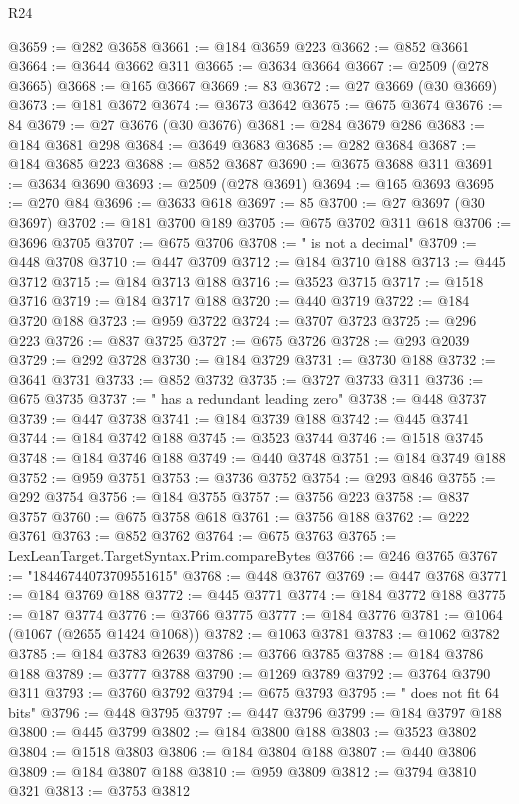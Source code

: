 \begin{lexlean}{R24}
\begin{coremodule}
@3659 := @282 @3658
@3661 := @184 @3659 @223
@3662 := @852 @3661
@3664 := @3644 @3662 @311
@3665 := @3634 @3664
@3667 := @2509 (@278 @3665)
@3668 := @165 @3667
@3669 := 83
@3672 := @27 @3669 (@30 @3669)
@3673 := @181 @3672
@3674 := @3673 @3642
@3675 := @675 @3674
@3676 := 84
@3679 := @27 @3676 (@30 @3676)
@3681 := @284 @3679 @286
@3683 := @184 @3681 @298
@3684 := @3649 @3683
@3685 := @282 @3684
@3687 := @184 @3685 @223
@3688 := @852 @3687
@3690 := @3675 @3688 @311
@3691 := @3634 @3690
@3693 := @2509 (@278 @3691)
@3694 := @165 @3693
@3695 := @270 @84
@3696 := @3633 @618
@3697 := 85
@3700 := @27 @3697 (@30 @3697)
@3702 := @181 @3700 @189
@3705 := @675 @3702 @311 @618
@3706 := @3696 @3705
@3707 := @675 @3706
@3708 := " is not a decimal"
@3709 := @448 @3708
@3710 := @447 @3709
@3712 := @184 @3710 @188
@3713 := @445 @3712
@3715 := @184 @3713 @188
@3716 := @3523 @3715
@3717 := @1518 @3716
@3719 := @184 @3717 @188
@3720 := @440 @3719
@3722 := @184 @3720 @188
@3723 := @959 @3722
@3724 := @3707 @3723
@3725 := @296 @223
@3726 := @837 @3725
@3727 := @675 @3726
@3728 := @293 @2039
@3729 := @292 @3728
@3730 := @184 @3729
@3731 := @3730 @188
@3732 := @3641 @3731
@3733 := @852 @3732
@3735 := @3727 @3733 @311
@3736 := @675 @3735
@3737 := " has a redundant leading zero"
@3738 := @448 @3737
@3739 := @447 @3738
@3741 := @184 @3739 @188
@3742 := @445 @3741
@3744 := @184 @3742 @188
@3745 := @3523 @3744
@3746 := @1518 @3745
@3748 := @184 @3746 @188
@3749 := @440 @3748
@3751 := @184 @3749 @188
@3752 := @959 @3751
@3753 := @3736 @3752
@3754 := @293 @846
@3755 := @292 @3754
@3756 := @184 @3755
@3757 := @3756 @223
@3758 := @837 @3757
@3760 := @675 @3758 @618
@3761 := @3756 @188
@3762 := @222 @3761
@3763 := @852 @3762
@3764 := @675 @3763
@3765 := LexLeanTarget.TargetSyntax.Prim.compareBytes
@3766 := @246 @3765
@3767 := "18446744073709551615"
@3768 := @448 @3767
@3769 := @447 @3768
@3771 := @184 @3769 @188
@3772 := @445 @3771
@3774 := @184 @3772 @188
@3775 := @187 @3774
@3776 := @3766 @3775
@3777 := @184 @3776
@3781 := @1064 (@1067 (@2655 @1424 @1068))
@3782 := @1063 @3781
@3783 := @1062 @3782
@3785 := @184 @3783 @2639
@3786 := @3766 @3785
@3788 := @184 @3786 @188
@3789 := @3777 @3788
@3790 := @1269 @3789
@3792 := @3764 @3790 @311
@3793 := @3760 @3792
@3794 := @675 @3793
@3795 := " does not fit 64 bits"
@3796 := @448 @3795
@3797 := @447 @3796
@3799 := @184 @3797 @188
@3800 := @445 @3799
@3802 := @184 @3800 @188
@3803 := @3523 @3802
@3804 := @1518 @3803
@3806 := @184 @3804 @188
@3807 := @440 @3806
@3809 := @184 @3807 @188
@3810 := @959 @3809
@3812 := @3794 @3810 @321
@3813 := @3753 @3812

\end{coremodule}
\end{lexlean}
